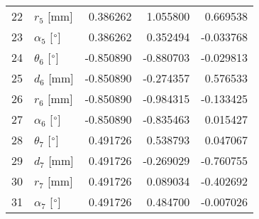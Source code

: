 \documentclass{standalone}%
\begin{document}
\begin{tabular}{llrrr}
22 &              $r_{5}$ [mm] &  0.386262 &   1.055800 &   0.669538 \\
23 &  $\alpha_{5}$ [$\degree$] &  0.386262 &   0.352494 &  -0.033768 \\
24 &  $\theta_{6}$ [$\degree$] & -0.850890 &  -0.880703 &  -0.029813 \\
25 &              $d_{6}$ [mm] & -0.850890 &  -0.274357 &   0.576533 \\
26 &              $r_{6}$ [mm] & -0.850890 &  -0.984315 &  -0.133425 \\
27 &  $\alpha_{6}$ [$\degree$] & -0.850890 &  -0.835463 &   0.015427 \\
28 &  $\theta_{7}$ [$\degree$] &  0.491726 &   0.538793 &   0.047067 \\
29 &              $d_{7}$ [mm] &  0.491726 &  -0.269029 &  -0.760755 \\
30 &              $r_{7}$ [mm] &  0.491726 &   0.089034 &  -0.402692 \\
31 &  $\alpha_{7}$ [$\degree$] &  0.491726 &   0.484700 &  -0.007026 \\
\bottomrule
\end{tabular}
%
\end{document}
